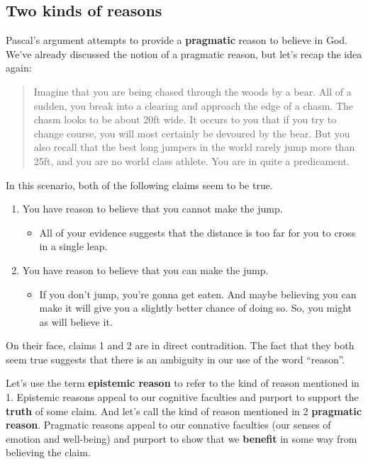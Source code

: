 \subsection{Two kinds of reasons}
Pascal's argument attempts to provide a \textbf{pragmatic} reason to believe in God.  We've already discussed the notion of a pragmatic reason, but let's recap the idea again:

\begin{quote}
Imagine that you are being chased through the woods by a bear.  All of a sudden, you break into a clearing and approach the edge of a chasm.  The chasm looks to be about 20ft wide. It occurs to you that if you try to change course, you will most certainly be devoured by the bear.  But you also recall that the best long jumpers in the world rarely jump more than 25ft, and you are no world class athlete. You are in quite a predicament.
\end{quote}

In this scenario, both of the following claims seem to be true.
\begin{enumerate}
 \item You have reason to believe that you cannot make the jump.
 \begin{itemize}
  \item All of your evidence suggests that the distance is too far for you to cross in a single leap.
 \end{itemize}
 \item You have reason to believe that you can make the jump.
 \begin{itemize}
  \item If you don't jump, you're gonna get eaten.  And maybe believing you can make it will give you a slightly better chance of doing so. So, you might as will believe it.
 \end{itemize}
\end{enumerate}

On their face, claims 1 and 2 are in direct contradition. The fact that they both seem true suggests that there is an ambiguity in our use of the word ``reason''.

Let's use the term \textbf{epistemic reason} to refer to the kind of reason mentioned in 1.  Epistemic reasons appeal to our cognitive faculties and purport to support the \textbf{truth} of some claim.  And let's call the kind of reason mentioned in 2 \textbf{pragmatic reason}.  Pragmatic reasons appeal to our connative faculties (our senses of emotion and well-being) and purport to show that we \textbf{benefit} in some way from believing the claim.

